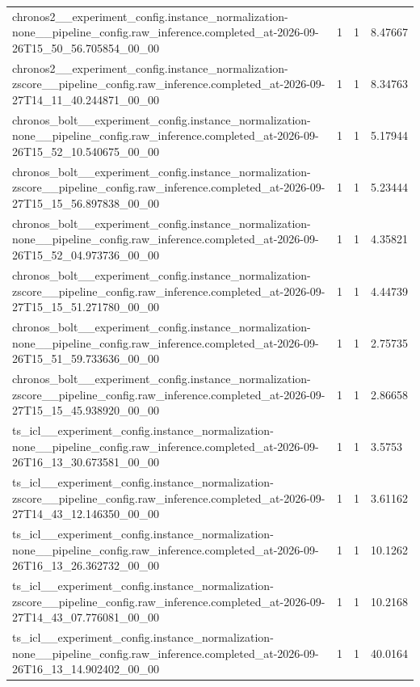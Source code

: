 \begin{tabular}{llll}
chronos2\_\_experiment\_config.instance\_normalization-none\_\_pipeline\_config.raw\_inference.completed\_at-2026-09-26T15\_50\_56.705854\_00\_00 & 1 & 1 & 8.47667 \\
chronos2\_\_experiment\_config.instance\_normalization-zscore\_\_pipeline\_config.raw\_inference.completed\_at-2026-09-27T14\_11\_40.244871\_00\_00 & 1 & 1 & 8.34763 \\
chronos\_bolt\_\_experiment\_config.instance\_normalization-none\_\_pipeline\_config.raw\_inference.completed\_at-2026-09-26T15\_52\_10.540675\_00\_00 & 1 & 1 & 5.17944 \\
chronos\_bolt\_\_experiment\_config.instance\_normalization-zscore\_\_pipeline\_config.raw\_inference.completed\_at-2026-09-27T15\_15\_56.897838\_00\_00 & 1 & 1 & 5.23444 \\
chronos\_bolt\_\_experiment\_config.instance\_normalization-none\_\_pipeline\_config.raw\_inference.completed\_at-2026-09-26T15\_52\_04.973736\_00\_00 & 1 & 1 & 4.35821 \\
chronos\_bolt\_\_experiment\_config.instance\_normalization-zscore\_\_pipeline\_config.raw\_inference.completed\_at-2026-09-27T15\_15\_51.271780\_00\_00 & 1 & 1 & 4.44739 \\
chronos\_bolt\_\_experiment\_config.instance\_normalization-none\_\_pipeline\_config.raw\_inference.completed\_at-2026-09-26T15\_51\_59.733636\_00\_00 & 1 & 1 & 2.75735 \\
chronos\_bolt\_\_experiment\_config.instance\_normalization-zscore\_\_pipeline\_config.raw\_inference.completed\_at-2026-09-27T15\_15\_45.938920\_00\_00 & 1 & 1 & 2.86658 \\
ts\_icl\_\_experiment\_config.instance\_normalization-none\_\_pipeline\_config.raw\_inference.completed\_at-2026-09-26T16\_13\_30.673581\_00\_00 & 1 & 1 & 3.5753 \\
ts\_icl\_\_experiment\_config.instance\_normalization-zscore\_\_pipeline\_config.raw\_inference.completed\_at-2026-09-27T14\_43\_12.146350\_00\_00 & 1 & 1 & 3.61162 \\
ts\_icl\_\_experiment\_config.instance\_normalization-none\_\_pipeline\_config.raw\_inference.completed\_at-2026-09-26T16\_13\_26.362732\_00\_00 & 1 & 1 & 10.1262 \\
ts\_icl\_\_experiment\_config.instance\_normalization-zscore\_\_pipeline\_config.raw\_inference.completed\_at-2026-09-27T14\_43\_07.776081\_00\_00 & 1 & 1 & 10.2168 \\
ts\_icl\_\_experiment\_config.instance\_normalization-none\_\_pipeline\_config.raw\_inference.completed\_at-2026-09-26T16\_13\_14.902402\_00\_00 & 1 & 1 & 40.0164 \\

\end{tabular}
